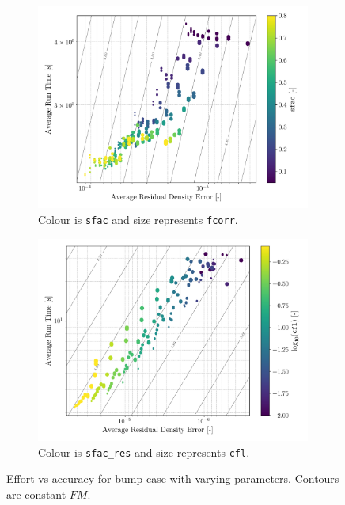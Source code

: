 \documentclass{article}
\begin{document}
\begin{figure}[H]
    \begin{subfigure}{0.49\textwidth}
        \centering
        \includegraphics[width=0.99\textwidth]{figures/effort_vs_accuracy_fcorr.png}
        \caption{Colour is \texttt{sfac} and size represents \texttt{fcorr}.}
        \label{fig:effort_vs_accuracy_fcorr}
    \end{subfigure}
    \begin{subfigure}{0.49\textwidth}
        \centering
        \includegraphics[width=0.99\textwidth]{figures/effort_vs_accuracy_sfac_res.png}
        \caption{Colour is \texttt{sfac\_res} and size represents \texttt{cfl}.}
        \label{fig:effort_vs_accuracy_sfac_res}
    \end{subfigure}
    \caption{Effort vs accuracy for bump case with varying parameters. Contours are constant $FM$.}
    \label{fig:effort_vs_accuracy_2}
\end{figure}
\end{document}
